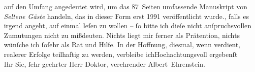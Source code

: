 \begin{ledgroupsized}[t]{13cm}
{{{                  auf den Umfang angedeutet wird, um das 87 Seiten umfassende Manuskript von \emph{Seltene Gäste} handeln, das in dieser Form erst
                     1991 veröffentlicht wurde.}}}\label{K_L01792_2h}, falls es irgend angeht, auf
               einmal leſen zu wollen – ſo bitte ich dieſe nicht anſpruchsvollen Zumutungen nicht zu
               mißdeuten. Nichts liegt mir ferner als Prätention, nichts wünſche ich ſoſehr als Rat
               und Hilfe. In der Hoffnung, diesmal, wenn verdient, realerer Erfolge teilhaftig zu
               werden, verbleibe ich\hspace*{1.5em}Hochachtungsvoll
               ergebenſt{\\}Ihr Sie, ſehr geehrter Herr Doktor, verehrender\pend
           \pstart \spacefill\mbox{Albert Ehrenstein.}\pend{}
         
         \endnumbering{}\end{ledgroupsized}  \newcommand{\dateiname}{L01792}\newcommand{\titel}{Albert Ehrenstein an Arthur Schnitzler, 10. 10. 1908}\newcommand{\editorInnen}{Martin Anton Müller und Gerd-Hermann Susen}
      